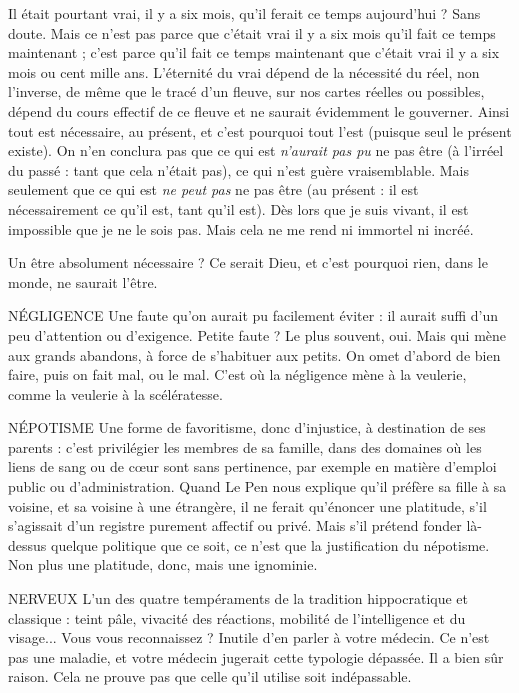 Il était pourtant vrai, il y a six mois, qu’il ferait ce temps aujourd’hui ? Sans
doute. Mais ce n’est pas parce que c'était vrai il y a six mois qu’il fait ce temps
maintenant ; c’est parce qu'il fait ce temps maintenant que c'était vrai il y a six
mois ou cent mille ans. L’éternité du vrai dépend de la nécessité du réel, non
l'inverse, de même que le tracé d’un fleuve, sur nos cartes réelles ou possibles,
dépend du cours effectif de ce fleuve et ne saurait évidemment le gouverner.
Ainsi tout est nécessaire, au présent, et c’est pourquoi tout l’est (puisque seul le
présent existe). On n’en conclura pas que ce qui est {\it n'aurait pas pu} ne pas être
(à l’irréel du passé : tant que cela n’était pas), ce qui n’est guère vraisemblable.
Mais seulement que ce qui est {\it ne peut pas} ne pas être (au présent : il est nécessairement
ce qu'il est, tant qu'il est). Dès lors que je suis vivant, il est impossible
que je ne le sois pas. Mais cela ne me rend ni immortel ni incréé.

Un être absolument nécessaire ? Ce serait Dieu, et c’est pourquoi rien, dans
le monde, ne saurait l'être.

NÉGLIGENCE Une faute qu’on aurait pu facilement éviter : il aurait suffi
d’un peu d’attention ou d’exigence. Petite faute ? Le plus
souvent, oui. Mais qui mène aux grands abandons, à force de s’habituer aux
petits. On omet d’abord de bien faire, puis on fait mal, ou le mal. C’est où la
négligence mène à la veulerie, comme la veulerie à la scélératesse.

NÉPOTISME Une forme de favoritisme, donc d’injustice, à destination de
ses parents : c’est privilégier les membres de sa famille, dans
des domaines où les liens de sang ou de cœur sont sans pertinence, par exemple
en matière d'emploi public ou d'administration. Quand Le Pen nous explique
qu’il préfère sa fille à sa voisine, et sa voisine à une étrangère, il ne ferait
qu'énoncer une platitude, s’il s'agissait d’un registre purement affectif ou privé.
Mais s’il prétend fonder là-dessus quelque politique que ce soit, ce n’est que la
justification du népotisme. Non plus une platitude, donc, mais une ignominie.

NERVEUX L'un des quatre tempéraments de la tradition hippocratique et
classique : teint pâle, vivacité des réactions, mobilité de l’intelligence
et du visage... Vous vous reconnaissez ? Inutile d’en parler à votre
médecin. Ce n’est pas une maladie, et votre médecin jugerait cette typologie
dépassée. Il a bien sûr raison. Cela ne prouve pas que celle qu’il utilise soit indépassable.

